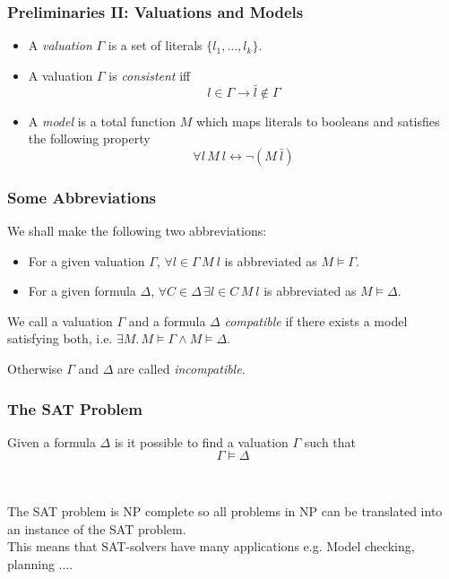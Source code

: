 \documentclass{beamer}
\begin{document}
\begin{frame}
\frametitle{Preliminaries II: Valuations and Models}


\begin{itemize}
\item A \emph{valuation} $\Gamma$ is a set of literals $\{ l_1, \ldots , l_k \}$.
\medskip
\item A valuation $\Gamma$ is \emph{consistent} iff $$l \in \Gamma \to \bar{l} \notin \Gamma$$
\medskip
\item A \emph{model} is a total function $M$ which maps literals to booleans and satisfies the following property
$$\forall l \,  M \ l \leftrightarrow \neg(M \ \bar{l})$$

\end{itemize}
\end{frame}



\begin{frame}
\frametitle{Some Abbreviations}

We shall make the following two abbreviations: 
\begin{itemize}
\item For a given valuation $\Gamma$, $\forall l \in \Gamma \, M \ l$ is abbreviated as $M \models \Gamma$.  
\item For a given formula $\Delta$, $\forall C \in \Delta \, \exists l \in C \, M \ l$ is abbreviated as $M \models \Delta$. 

\end{itemize}
\bigskip

We call a valuation $\Gamma$ and a formula $\Delta$ \emph{compatible} if there
exists a model satisfying both, i.e. $\exists M . \, M \models \Gamma \wedge M \models \Delta$. \\

\medskip

Otherwise $\Gamma$ and $\Delta$ are called \emph{incompatible}.




\end{frame}


\begin{frame}
\frametitle{The SAT Problem}

\begin{definition}
Given a formula $\Delta$ is it possible to find a valuation $\Gamma$ such that
 $$\Gamma \models \Delta$$
\end{definition} \hspace*{5pt }\\
\bigskip

The SAT problem is NP complete so all problems in NP can be translated into an instance of the SAT problem.\\

This means that SAT-solvers have many applications e.g. Model checking, planning $\ldots$.

\end{frame}
\end{document}
